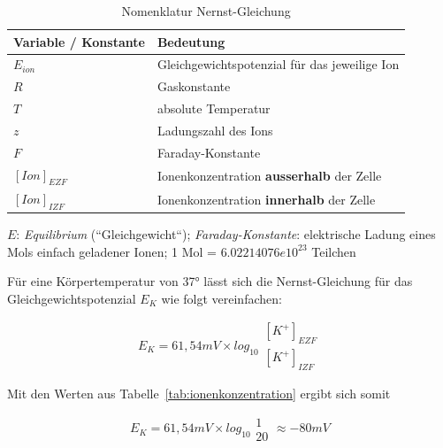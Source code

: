   {\renewcommand{\arraystretch}{1.5}%
\begin{table} %
\begin{center}
 \begin{tabular}{l |l }
  \textbf{Variable / Konstante} & \textbf{Bedeutung}  \\
  \hline
  $E_{ion}$            & Gleichgewichtspotenzial für das jeweilige Ion \\
  $R$                  & Gaskonstante \\
  $T$                  & absolute Temperatur \\
  $z$                  & Ladungszahl des Ions \\
  $F$                  & Faraday-Konstante \\
  $[Ion]_{EZF}$        & Ionenkonzentration \textbf{ausserhalb} der Zelle \\
  $[Ion]_{IZF}$        & Ionenkonzentration \textbf{innerhalb} der Zelle \\
 \end{tabular}
 \caption{Nomenklatur Nernst-Gleichung}
 \label{tab:nernstkonstanten}
\end{center}
 \small{
$E$: \textit{Equilibrium} (``Gleichgewicht``); \textit{Faraday-Konstante}: elektrische Ladung eines Mols einfach geladener Ionen; 1 Mol = $6.02214076e10^{23}$ Teilchen

}

\end{table}

\noindent
Für eine Körpertemperatur von 37° lässt sich die Nernst-Gleichung für das Gleichgewichtspotenzial $E_K$ wie folgt vereinfachen:

\begin{equation}
 E_{K} = 61,54 mV  \times log_{10} \begin{matrix} [K^+]_{EZF} \\ \hline [K^+]_{IZF} \end{matrix}
 \label{eq:gl-nernst-reduced-start}
\end{equation}

\noindent
Mit den Werten aus Tabelle~\ref{tab:ionenkonzentration}  ergibt sich somit


\begin{equation}
E_{K} = 61,54 mV  \times log_{10} \begin{matrix} 1 \\ \hline 20 \end{matrix} \approx -80 mV
\label{eq:gl-nernst-reduced-end}
\end{equation}

}
